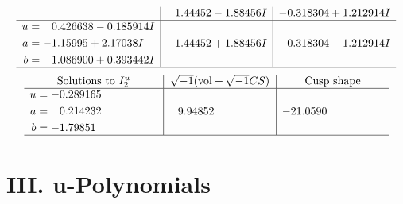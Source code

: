 \documentclass[1p]{elsarticle_modified}
\theoremstyle{definition}
\newcommand{\I}{\sqrt{-1}}
\begin{document}
$$\begin{array}{c|c|c}
 & \phantom{-}1.44452 - 1.88456 I & -0.318304 + 1.212914 I \\ \hline\begin{aligned}
u &= \phantom{-}0.426638 - 0.185914 I \\
a &= -1.15995 + 2.17038 I \\
b &= \phantom{-}1.086900 + 0.393442 I\end{aligned}
 & \phantom{-}1.44452 + 1.88456 I & -0.318304 - 1.212914 I\\
 \hline 
 \end{array}$$\newpage$$\begin{array}{c|c|c}  
\text{Solutions to }I^u_{2}& \I (\text{vol} + \sqrt{-1}CS) & \text{Cusp shape}\\
 \hline 
\begin{aligned}
u &= -0.289165\phantom{ +0.000000I} \\
a &= \phantom{-}0.214232\phantom{ +0.000000I} \\
b &= -1.79851\phantom{ +0.000000I}\end{aligned}
 & \phantom{-}9.94852\phantom{ +0.000000I} & -21.0590\phantom{ +0.000000I}\\
 \hline 
 \end{array}$$\newpage
\newpage\renewcommand{\arraystretch}{1}
\centering \section*{ III. u-Polynomials}
\end{document}
